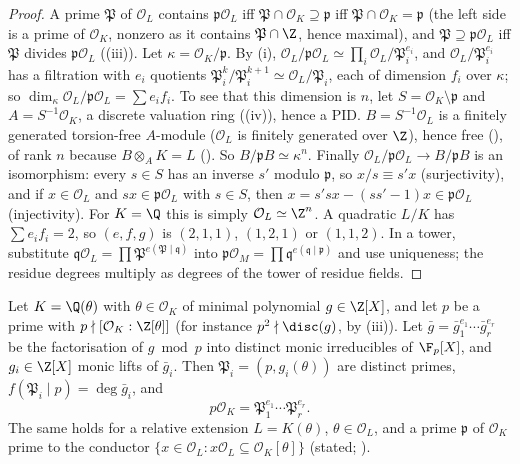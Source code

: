 \begin{proof}
A prime $\mathfrak P$ of $\mathcal O_L$ contains $\mathfrak p\mathcal O_L$ iff $\mathfrak P\cap\mathcal O_K\supseteq\mathfrak p$ iff $\mathfrak P\cap\mathcal O_K=\mathfrak p$
(the left side is a prime of $\mathcal O_K$, nonzero as it contains $\mathfrak P\cap\Z$, hence maximal), and $\mathfrak P\supseteq\mathfrak p\mathcal O_L$
iff $\mathfrak P$ divides $\mathfrak p\mathcal O_L$ ((iii)). Let $\kappa=\mathcal O_K/\mathfrak p$. By
(i), $\mathcal O_L/\mathfrak p\mathcal O_L\simeq\prod_i\mathcal O_L/\mathfrak P_i^{e_i}$, and $\mathcal O_L/\mathfrak P_i^{e_i}$ has a filtration
with $e_i$ quotients $\mathfrak P_i^k/\mathfrak P_i^{k+1}\simeq\mathcal O_L/\mathfrak P_i$, each of dimension $f_i$ over $\kappa$; so $\dim_\kappa\mathcal O_L/
\mathfrak p\mathcal O_L=\sum e_if_i$. To see that this dimension is $n$, let $S=\mathcal O_K\setminus\mathfrak p$ and $A=S^{-1}\mathcal O_K$, a discrete
valuation ring ((iv)), hence a PID. $B=S^{-1}\mathcal O_L$ is a finitely generated torsion-free $A$-module ($\mathcal O_L$ is finitely
generated over $\Z$), hence free (), of rank $n$ because $B\otimes_AK=L$ (). So $B/\mathfrak pB\simeq\kappa^n$.
Finally $\mathcal O_L/\mathfrak p\mathcal O_L\to B/\mathfrak pB$ is an isomorphism: every $s\in S$ has an inverse $s'$ modulo $\mathfrak p$, so $x/s\equiv s'x$
(surjectivity), and if $x\in\mathcal O_L$ and $sx\in\mathfrak p\mathcal O_L$ with $s\in S$, then $x=s'sx-(ss'-1)x\in\mathfrak p\mathcal O_L$ (injectivity). For
$K=\Q$ this is simply $\mathcal O_L\simeq\Z^n$. A quadratic $L/K$ has $\sum e_if_i=2$, so $(e,f,g)$ is $(2,1,1)$, $(1,2,1)$ or $(1,1,2)$. In a tower,
substitute $\mathfrak q\mathcal O_L=\prod\mathfrak P^{e(\mathfrak P\mid\mathfrak q)}$ into $\mathfrak p\mathcal O_M=\prod\mathfrak q^{e(\mathfrak q\mid\mathfrak p)}$ and use
uniqueness; the residue degrees multiply as degrees of the tower of residue fields.
\end{proof}

\begin{theorem}\label{thm:ant:dedekindkummer}
Let $K=\Q(\theta)$ with $\theta\in\mathcal O_K$ of minimal polynomial $g\in\Z[X]$, and let $p$ be a prime with $p\nmid[\mathcal O_K:\Z[\theta]]$ (for
instance $p^2\nmid\disc(g)$, by (iii)). Let $\bar g=\bar g_1^{e_1}\cdots\bar g_r^{e_r}$ be the factorisation of $g\bmod p$
into distinct monic irreducibles of $\F_p[X]$, and $g_i\in\Z[X]$ monic lifts of $\bar g_i$. Then $\mathfrak P_i=(p,g_i(\theta))$ are distinct primes,
$f(\mathfrak P_i\mid p)=\deg\bar g_i$, and
\[
p\mathcal O_K=\mathfrak P_1^{e_1}\cdots\mathfrak P_r^{e_r}.
\]
The same holds for a relative extension $L=K(\theta)$, $\theta\in\mathcal O_L$, and a prime $\mathfrak p$ of $\mathcal O_K$ prime to the conductor
$\{x\in\mathcal O_L:x\mathcal O_L\subseteq\mathcal O_K[\theta]\}$ (stated; \cite[Chapter I, Proposition 8.3]{Neukirch}).
\end{theorem}

